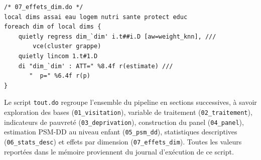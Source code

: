 \begin{verbatim}
/* 07_effets_dim.do */
local dims assai eau logem nutri sante protect educ
foreach dim of local dims {
    quietly regress dim_`dim' i.t##i.D [aw=weight_knn], ///
        vce(cluster grappe)
    quietly lincom 1.t#1.D
    di "dim_`dim' : ATT=" %8.4f r(estimate) ///
       "  p=" %6.4f r(p)
}
\end{verbatim}

Le script \texttt{tout.do} regroupe l'ensemble du pipeline en sections
successives, à savoir exploration des bases (\texttt{01\_visitation}), variable de
traitement (\texttt{02\_traitement}), indicateurs de pauvreté
(\texttt{03\_deprivation}), construction du panel (\texttt{04\_panel}),
estimation PSM-DD au niveau enfant (\texttt{05\_psm\_dd}), statistiques
descriptives (\texttt{06\_stats\_desc}) et effets par dimension
(\texttt{07\_effets\_dim}). Toutes les valeurs reportées dans le
mémoire proviennent du journal d'exécution de ce script.
